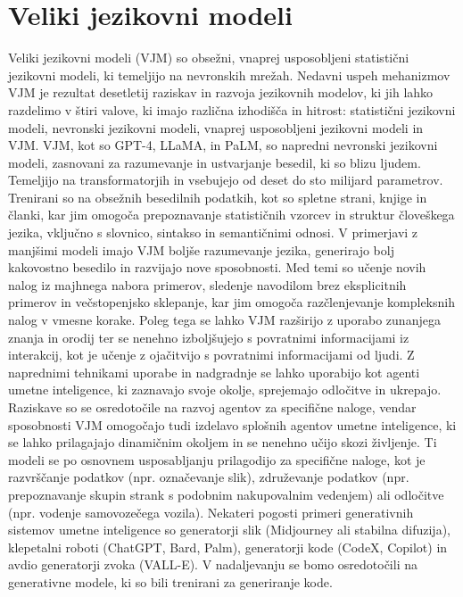 \documentclass[a4paper,12pt,openright]{book}
\begin{document}
\section{Veliki jezikovni modeli}
Veliki jezikovni modeli (VJM) so obsežni, vnaprej usposobljeni statistični jezikovni modeli, ki temeljijo na nevronskih mrežah. Nedavni uspeh mehanizmov VJM je rezultat desetletij raziskav in razvoja jezikovnih modelov, ki jih lahko razdelimo v štiri valove, ki imajo različna izhodišča in hitrost: statistični jezikovni modeli, nevronski jezikovni modeli, vnaprej usposobljeni jezikovni modeli in VJM.
\cite{minaee2024largelanguagemodelssurvey}
VJM, kot so GPT-4, LLaMA, in PaLM, so napredni nevronski jezikovni modeli, zasnovani za razumevanje in ustvarjanje besedil, ki so blizu ljudem. Temeljijo na transformatorjih in vsebujejo od deset do sto milijard parametrov. Trenirani so na obsežnih besedilnih podatkih, kot so spletne strani, knjige in članki, kar jim omogoča prepoznavanje statističnih vzorcev in struktur človeškega jezika, vključno s slovnico, sintakso in semantičnimi odnosi.
\cite{10.1145/3520312.3534862}
V primerjavi z manjšimi modeli imajo VJM boljše razumevanje jezika, generirajo bolj kakovostno besedilo in razvijajo nove sposobnosti. Med temi so učenje novih nalog iz majhnega nabora primerov, sledenje navodilom brez eksplicitnih primerov in večstopenjsko sklepanje, kar jim omogoča razčlenjevanje kompleksnih nalog v vmesne korake.
Poleg tega se lahko VJM razširijo z uporabo zunanjega znanja in orodij ter se nenehno izboljšujejo s povratnimi informacijami iz interakcij, kot je učenje z ojačitvijo s povratnimi informacijami od ljudi. Z naprednimi tehnikami uporabe in nadgradnje se lahko uporabijo kot agenti umetne inteligence, ki zaznavajo svoje okolje, sprejemajo odločitve in ukrepajo. Raziskave so se osredotočile na razvoj agentov za specifične naloge, vendar sposobnosti VJM omogočajo tudi izdelavo splošnih agentov umetne inteligence, ki se lahko prilagajajo dinamičnim okoljem in se nenehno učijo skozi življenje.
\cite{minaee2024largelanguagemodelssurvey}
Ti modeli se po osnovnem usposabljanju prilagodijo za specifične naloge, kot je razvrščanje podatkov (npr. označevanje slik), združevanje podatkov (npr. prepoznavanje skupin strank s podobnim nakupovalnim vedenjem) ali
odločitve (npr. vodenje samovozečega vozila). Nekateri pogosti primeri generativnih sistemov umetne inteligence so generatorji slik
(Midjourney ali stabilna difuzija), klepetalni roboti (ChatGPT, Bard,
Palm), generatorji kode (CodeX, Copilot) in avdio
generatorji zvoka (VALL-E). \cite{Hadi_2023}
V nadaljevanju se bomo osredotočili na generativne modele, ki so bili trenirani za generiranje kode.
\end{document}
